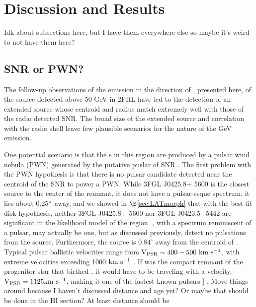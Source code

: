 %
%
\section{Discussion and Results}\label{sec:Discuss}
Idk about subsections here, but I have them everywhere else so maybe it's weird to not have them here?
\subsection{SNR or PWN?}\label{sec:PWNvsSNR}

The follow-up observations of the \gam{} emission in the direction of \Gone{}, presented here, of the source detected above 50 GeV in 2FHL have led to the detection of an extended \gam{} source whose centroid and radius match extremely well with those of the radio detected SNR. The broad size of the extended source and correlation with the radio shell leave few plausible scenarios for the nature of the GeV emission. 

One potential scenario is that the \gam{}s in this region are produced by a pulsar wind nebula (PWN) generated by the putative puslar of SNR \Gone{}. The first problem with the PWN hypothesis is that there is no pulsar candidate  detected near the centroid of the SNR to power a PWN. While 3FGL J0425.8+ 5600 is the closest \gam{} source to the center of the remnant, it does not have a pulsar-esque spectrum, it lies about ${\rm 0.25^\circ }$ away, and we showed in $\S$\ref{sec:LATmorph} that with the best-fit disk hypothesis, neither 3FGL J0425.8+ 5600 nor 3FGL J0423.5+5442 are significant in the likelihood model of the region. \psrLike{}, with a spectrum reminiscent of a pulsar,  may actually be one, but as discussed previously, \cite{Barr13} detect no pulsations from the source. Furthermore, the source is $0.84^\circ$ away from the centroid of \Gone{}. Typical pulsar ballistic velocities range from ${\rm V_{PSR} \sim 400-500~km~s^{-1}}$, with extreme velocities exceeding 1000 ${\rm km~s^{-1}}$ \citep{Gaensler06}. If \psrLike{} was the compact remnant of the progenitor star that birthed \Gone{}, it would have to be traveling with a velocity, ${\rm V_{PSR} = 1125  km~s^{-1}}$, making it one of the fastest known pulsars \cite{Chatterjee05} ] . Move things around because I haven't discussed distance and age yet? Or maybe that should be done in the HI section? At least distance should be

